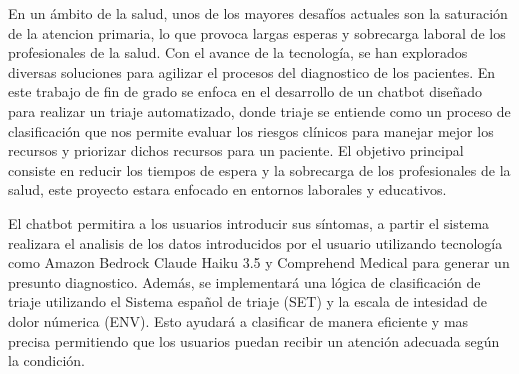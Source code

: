 
En un ámbito de la salud, unos de los mayores desafíos actuales son la saturación de la atencion primaria, lo que provoca largas esperas y sobrecarga laboral de los profesionales de la salud. Con el avance de la tecnología, se han explorados diversas soluciones para agilizar el procesos del diagnostico de los pacientes. En este trabajo de fin de grado se enfoca en el desarrollo de un chatbot diseñado para realizar un triaje automatizado, donde triaje se entiende como un proceso de clasificación que nos permite evaluar los riesgos clínicos para manejar mejor los recursos y priorizar dichos recursos para un paciente. El objetivo principal consiste en reducir los tiempos de espera y la sobrecarga de los profesionales de la salud, este proyecto estara enfocado en entornos laborales y educativos.

El chatbot permitira a los usuarios introducir sus síntomas, a partir el sistema realizara el analisis de los datos introducidos por el usuario utilizando tecnología como Amazon Bedrock Claude Haiku 3.5 y Comprehend Medical para generar un presunto diagnostico. Además, se implementará una lógica de clasificación de triaje utilizando el Sistema español de triaje (SET) y la escala de intesidad de dolor númerica (ENV). Esto ayudará a clasificar de manera eficiente y mas precisa permitiendo que los usuarios puedan recibir un atención adecuada según la condición.

